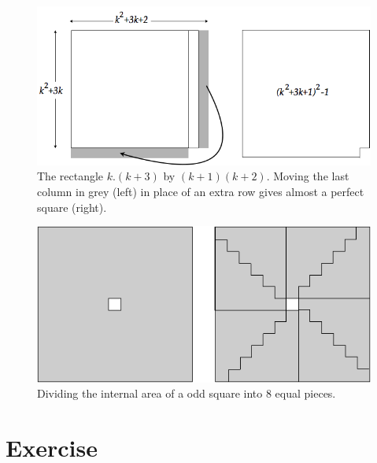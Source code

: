 \documentclass{article}[12pt]
\begin{document}
\begin{figure}[h]
\begin{center}
        \includegraphics[scale=0.5]{FiguresArithmetic/Product4consecutivePhase1} 
        \caption{The rectangle $k.(k+3)$ by $(k+1)(k+2)$. Moving the last column in grey (left) 
        in place of an extra row gives almost a perfect square (right).}
\end{center}
\end{figure}
\begin{figure}[h]
\begin{center}
        \includegraphics[scale=0.5]{FiguresArithmetic/Product4consecutivePhase2} 
        \caption{Dividing the internal area of a odd square into $8$ equal pieces.}
\end{center}
\end{figure}



\section{Exercise}
\end{document}
